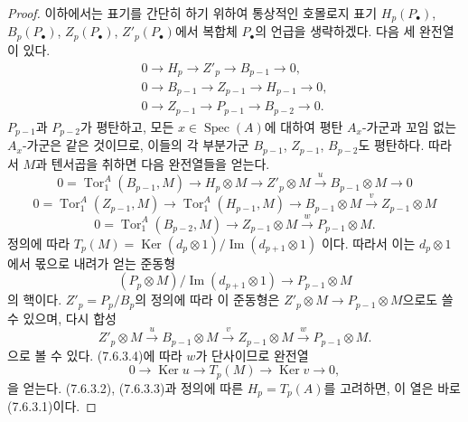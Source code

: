 \begin{proof}
이하에서는 표기를 간단히 하기 위하여 통상적인 호몰로지 표기
$H_p(P_\bullet)$, $B_p(P_\bullet)$, $Z_p(P_\bullet)$,
$Z'_p(P_\bullet)$에서 복합체 $P_\bullet$의 언급을 생략하겠다. 다음
세 완전열이 있다.
\begin{gather*}
  0\longrightarrow H_p\longrightarrow Z'_p\longrightarrow B_{p-1}
  \longrightarrow0,\\
  0\longrightarrow B_{p-1}\longrightarrow Z_{p-1}\longrightarrow H_{p-1}
  \longrightarrow0,\\
  0\longrightarrow Z_{p-1}\longrightarrow P_{p-1}\longrightarrow B_{p-2}
  \longrightarrow0.
\end{gather*}
$P_{p-1}$과 $P_{p-2}$가 평탄하고, 모든
$x\in\operatorname{Spec}(A)$에 대하여 평탄 $A_x$-가군과 꼬임 없는
$A_x$-가군은 같은 것이므로, 이들의 각 부분가군 $B_{p-1}$,
$Z_{p-1}$, $B_{p-2}$도 평탄하다. 따라서 $M$과 텐서곱을 취하면 다음
완전열들을 얻는다.
\[
  0=\operatorname{Tor}_1^A(B_{p-1},M)
  \longrightarrow H_p\otimes M
  \longrightarrow Z'_p\otimes M
  \xrightarrow{u}B_{p-1}\otimes M
  \longrightarrow0
  \tag{7.6.3.2}\label{III.7.6.3.2.fr}
\]
\[
  0=\operatorname{Tor}_1^A(Z_{p-1},M)
  \longrightarrow\operatorname{Tor}_1^A(H_{p-1},M)
  \longrightarrow B_{p-1}\otimes M
  \xrightarrow{v}Z_{p-1}\otimes M
  \tag{7.6.3.3}\label{III.7.6.3.3.fr}
\]
\[
  0=\operatorname{Tor}_1^A(B_{p-2},M)
  \longrightarrow Z_{p-1}\otimes M
  \xrightarrow{w}P_{p-1}\otimes M.
  \tag{7.6.3.4}\label{III.7.6.3.4.fr}
\]
정의에 따라
$T_p(M)=\operatorname{Ker}(d_p\otimes1)/\operatorname{Im}(d_{p+1}\otimes1)$
이다. 따라서 이는 $d_p\otimes1$에서 몫으로 내려가 얻는 준동형
\[
  (P_p\otimes M)/\operatorname{Im}(d_{p+1}\otimes1)
  \longrightarrow P_{p-1}\otimes M
\]
의 핵이다. $Z'_p=P_p/B_p$의 정의에 따라 이 준동형은
$Z'_p\otimes M\to P_{p-1}\otimes M$으로도 쓸 수 있으며, 다시 합성
\[
  Z'_p\otimes M
  \xrightarrow{u}B_{p-1}\otimes M
  \xrightarrow{v}Z_{p-1}\otimes M
  \xrightarrow{w}P_{p-1}\otimes M.
\]
으로 볼 수 있다. (7.6.3.4)에 따라 $w$가 단사이므로 완전열
\[
  0\longrightarrow\operatorname{Ker}u
  \longrightarrow T_p(M)
  \longrightarrow\operatorname{Ker}v
  \longrightarrow0,
\]
을 얻는다. (7.6.3.2), (7.6.3.3)과 정의에 따른 $H_p=T_p(A)$를
고려하면, 이 열은 바로 (7.6.3.1)이다.
\end{proof}


